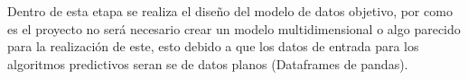 Dentro de esta etapa se realiza el diseño del modelo de datos objetivo, por como es el proyecto no será necesario crear un modelo multidimensional o algo parecido para la realización de este, esto debido a que los datos de entrada para los algoritmos predictivos seran se de datos planos (Dataframes de pandas).